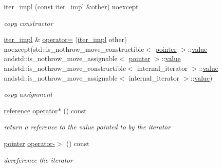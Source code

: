 \begin{DoxyCompactItemize}
\item 
\hyperlink{classnlohmann_1_1basic__json_1_1iter__impl_a94c010c069b5aed9e064e0579eac9a64}{iter\+\_\+impl} (const \hyperlink{classnlohmann_1_1basic__json_1_1iter__impl}{iter\+\_\+impl} \&other) noexcept
\begin{DoxyCompactList}\small\item\em copy constructor \end{DoxyCompactList}\item 
\hyperlink{classnlohmann_1_1basic__json_1_1iter__impl}{iter\+\_\+impl} \& \hyperlink{classnlohmann_1_1basic__json_1_1iter__impl_ad495ca8531bd919186edaa8fa1050fd2}{operator=} (\hyperlink{classnlohmann_1_1basic__json_1_1iter__impl}{iter\+\_\+impl} other) noexcept(std\+::is\+\_\+nothrow\+\_\+move\+\_\+constructible$<$ \hyperlink{classnlohmann_1_1basic__json_1_1iter__impl_a3dddd7fa38b36e2531700ceb4a1ce9a8}{pointer} $>$\+::\hyperlink{classnlohmann_1_1basic__json_1_1iter__impl_a2597c381f70b376336bd4faa87fadc28}{value} andstd\+::is\+\_\+nothrow\+\_\+move\+\_\+assignable$<$ \hyperlink{classnlohmann_1_1basic__json_1_1iter__impl_a3dddd7fa38b36e2531700ceb4a1ce9a8}{pointer} $>$\+::\hyperlink{classnlohmann_1_1basic__json_1_1iter__impl_a2597c381f70b376336bd4faa87fadc28}{value} andstd\+::is\+\_\+nothrow\+\_\+move\+\_\+constructible$<$ internal\+\_\+iterator $>$\+::\hyperlink{classnlohmann_1_1basic__json_1_1iter__impl_a2597c381f70b376336bd4faa87fadc28}{value} andstd\+::is\+\_\+nothrow\+\_\+move\+\_\+assignable$<$ internal\+\_\+iterator $>$\+::\hyperlink{classnlohmann_1_1basic__json_1_1iter__impl_a2597c381f70b376336bd4faa87fadc28}{value})
\begin{DoxyCompactList}\small\item\em copy assignment \end{DoxyCompactList}\item 
\hyperlink{classnlohmann_1_1basic__json_1_1iter__impl_ae09599e9cb4a947020a0265c0c4f3d5e}{reference} \hyperlink{classnlohmann_1_1basic__json_1_1iter__impl_ad5a6781452d081b09b354f590818545d}{operator$\ast$} () const 
\begin{DoxyCompactList}\small\item\em return a reference to the value pointed to by the iterator \end{DoxyCompactList}\item 
\hyperlink{classnlohmann_1_1basic__json_1_1iter__impl_a3dddd7fa38b36e2531700ceb4a1ce9a8}{pointer} \hyperlink{classnlohmann_1_1basic__json_1_1iter__impl_a958c52d01ed6594c8052bfd42868714e}{operator-\/$>$} () const 
\begin{DoxyCompactList}\small\item\em dereference the iterator \end{DoxyCompactList}\item 

\end{DoxyCompactItemize}
